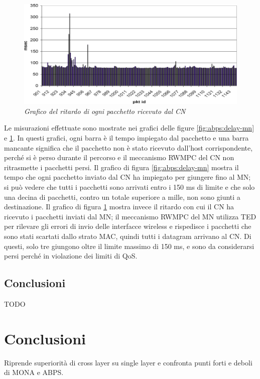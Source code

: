 \documentclass[12pt,a4paper,openright,twoside]{book}
\begin{document}
\begin{figure}
  \centering
  \includegraphics[width=\textwidth]{img/abps-delay-cn}
  \caption{\em Grafico del ritardo di ogni pacchetto ricevuto dal CN}
  \label{fig:abps:delay-cn}
\end{figure}

Le misurazioni effettuate sono mostrate nei grafici delle figure
\ref{fig:abps:delay-mn} e \ref{fig:abps:delay-cn}. In questi grafici,
ogni barra è il tempo impiegato dal pacchetto e una barra mancante
significa che il pacchetto non è stato ricevuto dall'host
corrispondente, perché si è perso durante il percorso e il meccanismo
RWMPC del CN non ritrasmette i pacchetti persi. Il grafico di figura
\ref{fig:abps:delay-mn} mostra il tempo che ogni pacchetto inviato dal
CN ha impiegato per giungere fino al MN; si può vedere che tutti i
pacchetti sono arrivati entro i 150 ms di limite e che solo una decina
di pacchetti, contro un totale superiore a mille, non sono giunti a
destinazione. Il grafico di figura \ref{fig:abps:delay-cn} mostra
invece il ritardo con cui il CN ha ricevuto i pacchetti inviati dal
MN; il meccanismo RWMPC del MN utilizza TED per rilevare gli errori di
invio delle interfacce wireless e rispedisce i pacchetti che sono
stati scartati dallo strato MAC, quindi tutti i datagram arrivano al
CN. Di questi, solo tre giungono oltre il limite massimo di 150 ms, e
sono da considerarsi persi perché in violazione dei limiti di QoS.

\section{Conclusioni}

TODO

\clearpage{\pagestyle{empty}\cleardoublepage}


\chapter{Conclusioni}
Riprende superiorità di cross layer su single layer e confronta punti
forti e deboli di MONA e ABPS.
\end{document}
